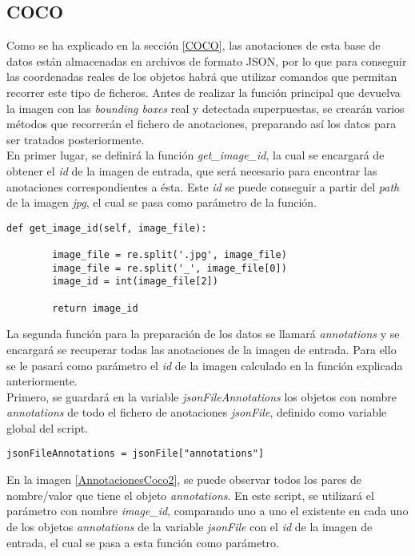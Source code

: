 \documentclass[a4paper, 12pt, oneside]{book}
\begin{document}
\subsection{COCO}\label{CompareCOCO}

Como se ha explicado en la sección \ref{COCO}, las anotaciones de esta base de datos están almacenadas en archivos de formato JSON, por lo que para conseguir las coordenadas reales de los objetos habrá que utilizar comandos que permitan recorrer este tipo de ficheros. Antes de realizar la función principal que devuelva la imagen con las \textit{bounding boxes} real y detectada superpuestas, se crearán varios métodos que recorrerán el fichero de anotaciones, preparando así los datos para ser tratados posteriormente.\\

En primer lugar, se definirá la función \textit{get\_image\_id}, la cual se encargará de obtener el \textit{id} de la imagen de entrada, que será necesario para encontrar las anotaciones correspondientes a ésta. Este \textit{id} se puede conseguir a partir del \textit{path} de la imagen \textit{jpg}, el cual se pasa como parámetro de la función.\\

\begin{lstlisting}[frame=single]
def get_image_id(self, image_file):

        image_file = re.split('.jpg', image_file)
        image_file = re.split('_', image_file[0])
        image_id = int(image_file[2])

        return image_id
\end{lstlisting}

La segunda función para la preparación de los datos se llamará \textit{annotations} y se encargará se recuperar todas las anotaciones de la imagen de entrada. Para ello se le pasará como parámetro el \textit{id} de la imagen calculado en la función explicada anteriormente.\\

Primero, se guardará en la variable \textit{jsonFileAnnotations} los objetos con nombre \textit{annotations} de todo el fichero de anotaciones \textit{jsonFile}, definido como variable global del script.\\

\begin{lstlisting}[frame=single]
jsonFileAnnotations = jsonFile["annotations"]
\end{lstlisting}

En la imagen \ref{AnnotacionesCoco2}, se puede observar todos los pares de nombre/valor que tiene el objeto \textit{annotations}. En este script, se utilizará el parámetro con nombre \textit{image\_id}, comparando uno a uno el existente en cada uno de los objetos \textit{annotations} de la variable \textit{jsonFile} con el \textit{id} de la imagen de entrada, el cual se pasa a esta función como parámetro.\\
\end{document}
